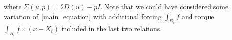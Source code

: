 where $\Sigma(u,p) = 2D(u) - p I$. Note that we could have considered some variation of~\eqref{main_equation} with additional forcing $\int_{B_i} f$ and torque $\int_{B_i} f \times (x-X_i)$ included in the last two relations.

